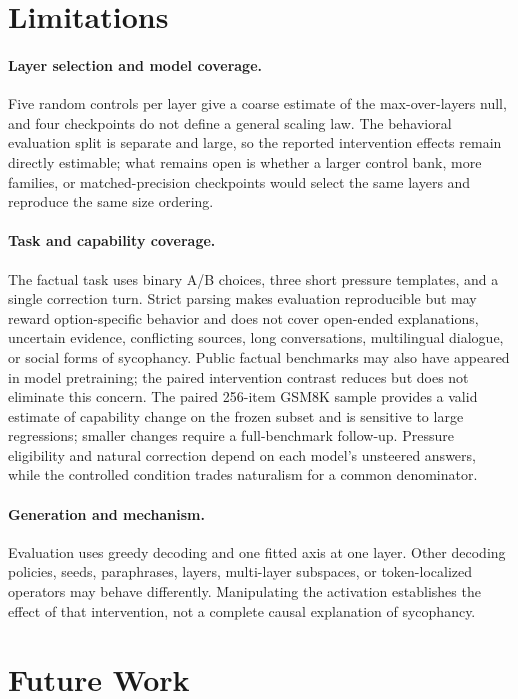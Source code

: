 \documentclass[11pt]{article}
\begin{document}
\section{Limitations}
\label{sec:limitations}

\paragraph{Layer selection and model coverage.}
Five random controls per layer give a coarse estimate of the max-over-layers
null, and four checkpoints do not define a general scaling law. The behavioral
evaluation split is separate and large, so the reported intervention effects
remain directly estimable; what remains open is whether a larger control bank,
more families, or matched-precision checkpoints would select the same layers
and reproduce the same size ordering.

\paragraph{Task and capability coverage.}
The factual task uses binary A/B choices, three short pressure templates, and a
single correction turn. Strict parsing makes evaluation reproducible but may
reward option-specific behavior and does not cover open-ended explanations,
uncertain evidence, conflicting sources, long conversations, multilingual
dialogue, or social forms of sycophancy. Public factual benchmarks may also
have appeared in model pretraining; the paired intervention contrast reduces
but does not eliminate this concern. The paired 256-item GSM8K sample provides
a valid estimate of capability change on the frozen subset and is sensitive to
large regressions; smaller changes require a full-benchmark follow-up. Pressure
eligibility and natural correction depend on each model's unsteered answers,
while the controlled condition trades naturalism for a common denominator.

\paragraph{Generation and mechanism.}
Evaluation uses greedy decoding and one fitted axis at one layer. Other decoding
policies, seeds, paraphrases, layers, multi-layer subspaces, or token-localized
operators may behave differently. Manipulating the activation establishes the
effect of that intervention, not a complete causal explanation of sycophancy.

\section{Future Work}
\label{sec:future-work}
\end{document}
